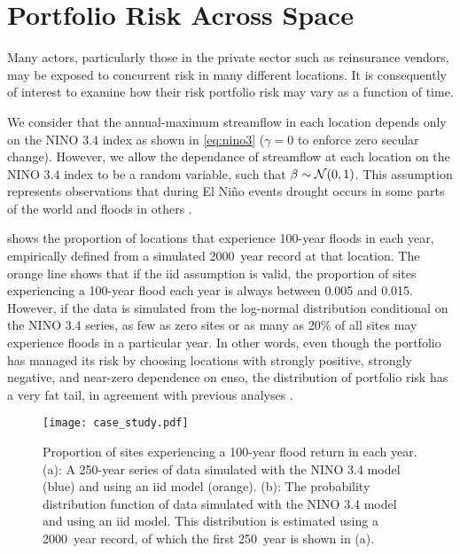 \documentclass[12pt]{article}
\begin{document}
\section{Portfolio Risk Across Space}

Many actors, particularly those in the private sector such as reinsurance vendors, may be exposed to concurrent risk in many different locations.
It is consequently of interest to examine how their risk portfolio risk may vary as a function of time.

We consider that the annual-maximum streamflow in each location depends only on the NINO 3.4 index as shown in \cref{eq:nino3} ($\gamma=0$ to enforce zero secular change).
However, we allow the dependance of streamflow at each location on the NINO 3.4 index to be a random variable, such that $\beta \sim \mathcal{N} \qty(0, 1)$.
This assumption represents observations that during El Ni\~no events drought occurs in some parts of the world and floods in others \citep{Ropelewski1987,Ward2014}.

 shows the proportion of locations that experience 100-year floods in each year, empirically defined from a simulated \SI{2000}{year} record at that location.
The orange line shows that if the \gls{iid} assumption is valid, the proportion of sites experiencing a 100-year flood each year is always between 0.005 and 0.015.
However, if the data is simulated from the log-normal distribution conditional on the NINO 3.4 series, as few as zero sites or as many as 20\% of all sites may experience floods in a particular year.
In other words, even though the portfolio has managed its risk by choosing locations with strongly positive, strongly negative, and near-zero dependence on \gls{enso}, the distribution of portfolio risk has a very fat tail, in agreement with previous analyses \citep{Bonnafous2017a}.
\begin{figure}
  \texttt{[image: case\_study.pdf]}
  \caption{
    Proportion of sites experiencing a 100-year flood return in each year.
    (a): A 250-year series of data simulated with the NINO 3.4 model (blue) and using an \gls{iid} model (orange). 
    (b): The probability distribution function of data simulated with the NINO 3.4 model and using an \gls{iid} model.
    This distribution is estimated using a \SI{2000}{year} record, of which the first \SI{250}{year} is shown in (a).\label{fig:spatial-risk}
  }
\end{figure}

\end{document}
